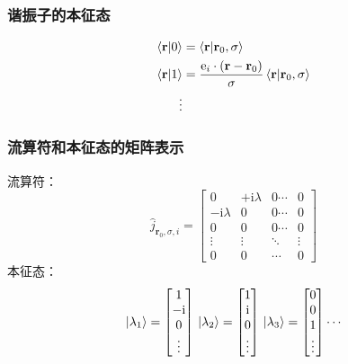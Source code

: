 \documentclass[UTF8]{beamer}
\begin{document}
\begin{frame}
    \frametitle{谐振子的本征态}
    \begin{align}
        \braket{\mathbf{r}|0}&=\braket{\mathbf{r}|\mathbf{r}_0,\sigma}\nonumber\\
        \braket{\mathbf{r}|1}&=\frac{\mathrm{e}_i\cdot(\mathbf{r}-\mathbf{r}_0)}{\sigma}\braket{\mathbf{r}|\mathbf{r}_0,\sigma}\\
        \vdots \nonumber
    \end{align}
\end{frame}
\begin{frame}
    \frametitle{流算符和本征态的矩阵表示}
    流算符：
    \begin{equation*}
        \hat{j}_{\mathbf{r}_0,\sigma,i}=
        \begin{bmatrix}
            0                 &+\mathrm{i}\lambda&0\cdots&0\\
            -\mathrm{i}\lambda&0                 &0\cdots&0\\
            0                 &0                 &0\cdots&0\\
            \vdots            &\vdots            &\ddots &\vdots \\
            0                   &0               &\cdots&0    
        \end{bmatrix}
    \end{equation*}
    本征态：
    \begin{equation*}
        \,\ket{\lambda_{1}}=
        \begin{bmatrix}
            1\\
            -\mathrm{i}\\
            0\\
            \vdots
        \end{bmatrix}
        \,\ket{\lambda_{2}}=
        \begin{bmatrix}
            1\\
            \mathrm{i}\\
            0\\
            \vdots
        \end{bmatrix}
        \,\ket{\lambda_{3}}=
        \begin{bmatrix}
            0\\
            0\\
            1\\
            \vdots
        \end{bmatrix}
        \cdots
    \end{equation*}
\end{frame}
\end{document}
